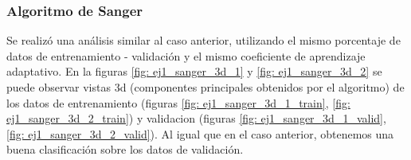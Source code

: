 \subsubsection{Algoritmo de Sanger}

\par Se realizó una análisis similar al caso anterior, utilizando el mismo porcentaje de datos de entrenamiento - validación y el mismo coeficiente de aprendizaje adaptativo. En la figuras \ref{fig: ej1_sanger_3d_1} y \ref{fig: ej1_sanger_3d_2} se puede observar vistas 3d (componentes principales obtenidos por el algoritmo) de los datos de entrenamiento (figuras \ref{fig: ej1_sanger_3d_1_train}, \ref{fig: ej1_sanger_3d_2_train}) y validacion (figuras \ref{fig: ej1_sanger_3d_1_valid}, \ref{fig: ej1_sanger_3d_2_valid}). Al igual que en el caso anterior, obtenemos una buena clasificación sobre los datos de validación.

